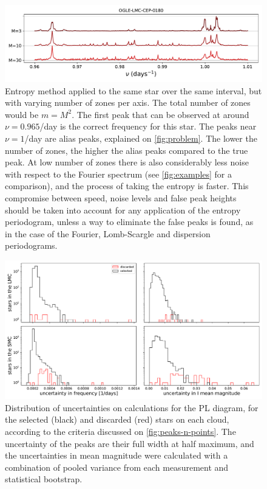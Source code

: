 \begin{figure}
	\centering
	\includegraphics[width=\textwidth]{img/entropy_bins.pdf}
	\caption[Example of zone number dependency for the entropy method]{
		Entropy method applied to the same star over the same interval, but with varying number of zones per axis.
		The total number of zones would be $m=M^2$. 
		The first peak that can be observed at around $\nu=0.965$/day is the correct frequency for this star.
		The peaks near $\nu=1$/day are alias peaks, explained on \autoref{fig:problem}.
		The lower the number of zones, the higher the alias peaks compared to the true peak.
		At low number of zones there is also considerably less noise with respect to the Fourier spectrum 
		(see \autoref{fig:examples} for a comparison), and the process of taking the entropy is faster.
		This compromise between speed, noise levels and false peak heights should be taken into account 
		for any application of the entropy periodogram, unless a way to eliminate the false peaks is found,
		as in the case of the Fourier, Lomb-Scargle and dispersion periodograms.
	}
	\label{fig:entropy-alias}
\end{figure}

\begin{figure}
	\centering
	\includegraphics[width=\textwidth]{img/results_uncertainties.pdf}
	\caption[Uncertainties in the PL relation for the processed stars]{
		Distribution of uncertainties on calculations for the PL diagram, for the selected (black) and discarded (red) stars on each cloud, 
		according to the criteria discussed on \autoref{fig:peaks-n-points}.
		The uncertainty of the peaks are their full width at half maximum, 
		and the uncertainties in mean magnitude were calculated with a combination of pooled variance from each measurement and statistical bootstrap.
	}
	\label{fig:uncertainties}
\end{figure}


